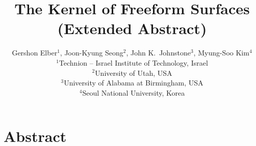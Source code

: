 \documentclass{acmsiggraph}
\begin{document}
\newenvironment{notepar}{\par\smallskip\noindent{}\
\ignorespaces}{\stopproof\ignorespaces\bigbreak}

\newcommand{\CH}{{\cal C}{\cal H}}
\newcommand{\inner}[2]{\left<{#1}, {#2} \right>}

\def\stopproof{\qquad\square}
\def\square{\vbox{\hrule height.2pt\hbox{\vrule width.2pt height5pt
\kern5pt \vrule width.2pt} \hrule height.2pt}}

\newcommand{\Comment}[1]{\relax}  %
\newcommand{\QED}{\vrule height 1.4ex width 1.0ex depth -.1ex\ \vspace{.3in}} %
\newcommand{\lyne}[1]{\mbox{$\stackrel{\textstyle \leftrightarrow}{#1}$}}
\newcommand{\seg}[1]{\mbox{$\overline{#1}$}}
\newcommand{\prf}{\noindent{{\bf Proof}:\ \ \ }}
\newcommand{\choice}[2]{\mbox{\footnotesize{$\left( \begin{array}{c} #1 \\ #2 \end{array} \right)$}}}      
\newcommand{\scriptchoice}[2]{\mbox{\scriptsize{$\left( \begin{array}{c} #1 \\ #2 \end{array} \right)$}}}
\newcommand{\tinychoice}[2]{\mbox{\tiny{$\left( \begin{array}{c} #1 \\ #2 \end{array} \right)$}}}


\title{The Kernel of Freeform Surfaces\\[-0.07in]
{\normalsize (Extended Abstract)}}

\author{Gershon Elber$^1$, Joon-Kyung Seong$^2$, John K.~Johnstone$^3$, Myung-Soo Kim$^4$\\
$^1$Technion -- Israel Institute of Technology, Israel\\
$^2$University of Utah, USA\\
$^3$University of Alabama at Birmingham, USA\\
$^4$Seoul National University, Korea}

\maketitle

\section*{Abstract}
\end{document}
